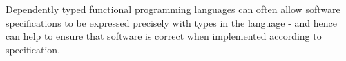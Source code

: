 Dependently typed functional programming languages can often allow software specifications to be expressed precisely with types in the language - and hence can help to ensure that software is correct when implemented according to specification.
